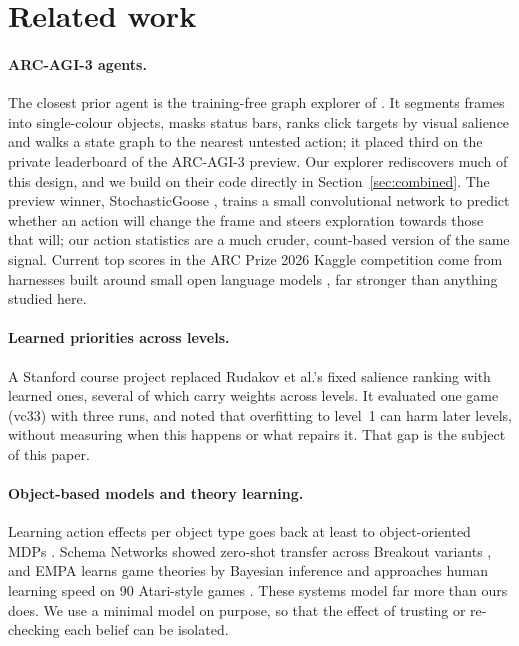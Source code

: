 \documentclass[11pt,a4paper]{article}
\begin{document}
\section{Related work}

\paragraph{ARC-AGI-3 agents.} The closest prior agent is the training-free graph explorer of \citet{rudakov2025}. It segments frames into single-colour objects, masks status bars, ranks click targets by visual salience and walks a state graph to the nearest untested action; it placed third on the private leaderboard of the ARC-AGI-3 preview. Our explorer rediscovers much of this design, and we build on their code directly in Section~\ref{sec:combined}. The preview winner, StochasticGoose \citep{smit2025}, trains a small convolutional network to predict whether an action will change the frame and steers exploration towards those that will; our action statistics are a much cruder, count-based version of the same signal. Current top scores in the ARC Prize 2026 Kaggle competition come from harnesses built around small open language models \citep{metir2026}, far stronger than anything studied here.

\paragraph{Learned priorities across levels.} A Stanford course project \citep{bookman2026} replaced Rudakov et al.'s fixed salience ranking with learned ones, several of which carry weights across levels. It evaluated one game (vc33) with three runs, and noted that overfitting to level~1 can harm later levels, without measuring when this happens or what repairs it. That gap is the subject of this paper.

\paragraph{Object-based models and theory learning.} Learning action effects per object type goes back at least to object-oriented MDPs \citep{diuk2008}. Schema Networks showed zero-shot transfer across Breakout variants \citep{kansky2017}, and EMPA learns game theories by Bayesian inference and approaches human learning speed on 90 Atari-style games \citep{tsividis2021}. These systems model far more than ours does. We use a minimal model on purpose, so that the effect of trusting or re-checking each belief can be isolated.
\end{document}
